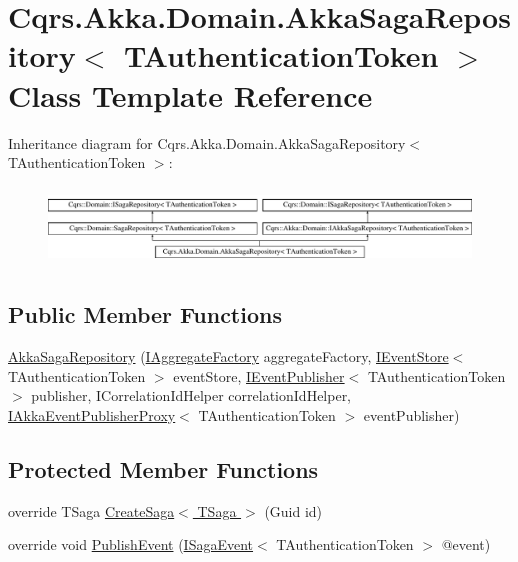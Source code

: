 \hypertarget{classCqrs_1_1Akka_1_1Domain_1_1AkkaSagaRepository}{}\section{Cqrs.\+Akka.\+Domain.\+Akka\+Saga\+Repository$<$ T\+Authentication\+Token $>$ Class Template Reference}
\label{classCqrs_1_1Akka_1_1Domain_1_1AkkaSagaRepository}
Inheritance diagram for Cqrs.\+Akka.\+Domain.\+Akka\+Saga\+Repository$<$ T\+Authentication\+Token $>$\+:\begin{figure}[H]
\begin{center}
\leavevmode
\includegraphics[height=2.105263cm]{classCqrs_1_1Akka_1_1Domain_1_1AkkaSagaRepository}
\end{center}
\end{figure}
\subsection*{Public Member Functions}
\begin{DoxyCompactItemize}
\item 
\hyperlink{classCqrs_1_1Akka_1_1Domain_1_1AkkaSagaRepository_a8297f64e2b7a7be7bcc999c89dcece05_a8297f64e2b7a7be7bcc999c89dcece05}{Akka\+Saga\+Repository} (\hyperlink{interfaceCqrs_1_1Domain_1_1Factories_1_1IAggregateFactory}{I\+Aggregate\+Factory} aggregate\+Factory, \hyperlink{interfaceCqrs_1_1Events_1_1IEventStore}{I\+Event\+Store}$<$ T\+Authentication\+Token $>$ event\+Store, \hyperlink{interfaceCqrs_1_1Events_1_1IEventPublisher}{I\+Event\+Publisher}$<$ T\+Authentication\+Token $>$ publisher, I\+Correlation\+Id\+Helper correlation\+Id\+Helper, \hyperlink{interfaceCqrs_1_1Akka_1_1Events_1_1IAkkaEventPublisherProxy}{I\+Akka\+Event\+Publisher\+Proxy}$<$ T\+Authentication\+Token $>$ event\+Publisher)
\end{DoxyCompactItemize}
\subsection*{Protected Member Functions}
\begin{DoxyCompactItemize}
\item 
override T\+Saga \hyperlink{classCqrs_1_1Akka_1_1Domain_1_1AkkaSagaRepository_a2c7263d0e58d2b31149ec685d5be934a_a2c7263d0e58d2b31149ec685d5be934a}{Create\+Saga$<$ T\+Saga $>$} (Guid id)
\item 
override void \hyperlink{classCqrs_1_1Akka_1_1Domain_1_1AkkaSagaRepository_a7f6375bb99e680792466fb420232a535_a7f6375bb99e680792466fb420232a535}{Publish\+Event} (\hyperlink{interfaceCqrs_1_1Events_1_1ISagaEvent}{I\+Saga\+Event}$<$ T\+Authentication\+Token $>$ @event)
\end{DoxyCompactItemize}
